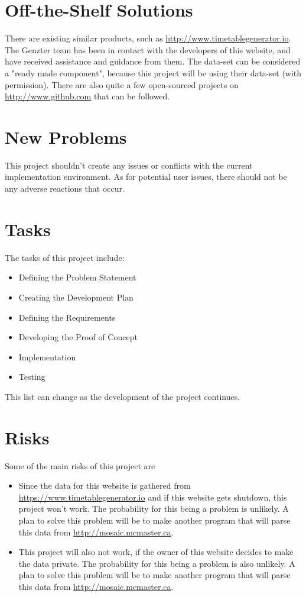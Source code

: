 \documentclass[12pt]{article}
\begin{document}
\section{Off-the-Shelf Solutions}
There are existing similar products, such as \url{http://www.timetablegenerator.io}. The Genzter team has been in contact with the developers of this website, and have received assistance and guidance from them. The data-set can be considered a "ready made component", because this project will be using their data-set (with permission). There are also quite a few open-sourced projects on \url{http://www.github.com} that can be followed.

\section{New Problems}
This project shouldn't create any issues or conflicts with the current implementation environment. As for potential user issues, there should not be any adverse reactions that occur.
\section{Tasks}
The tasks of this project include:
\begin{itemize}
  \item Defining the Problem Statement
  \item Creating the Development Plan
  \item Defining the Requirements
  \item Developing the Proof of Concept
  \item Implementation
  \item Testing
\end{itemize}
This list can change as the development of the project continues.

\section{Risks}
    Some of the main risks of this project are 
    
    \begin{itemize}
        \item 
        Since the data for this website is gathered from \url{https://www.timetablegenerator.io} and if this website gets shutdown, this project won't work. The probability for this being a problem is unlikely. A plan to solve this problem will be to make another program that will parse this data from \url{http://mosaic.mcmaster.ca}.
        \item
        This project will also not work, if the owner of this website decides to make the data private. The probability for this being a problem is also unlikely. A plan to solve this problem will be to make another program that will parse this data from \url{http://mosaic.mcmaster.ca}.
        
    \end{itemize}
\end{document}
